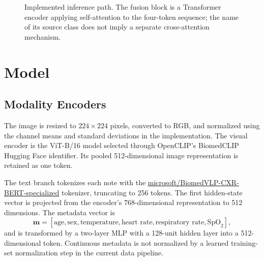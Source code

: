 \documentclass[conference]{IEEEtran}
\begin{document}
\begin{figure}[t]
{%
}
\caption{Implemented inference path. The fusion block is a Transformer encoder applying self-attention to the four-token sequence; the name of its source class does not imply a separate cross-attention mechanism.}
\label{fig:architecture}
\end{figure}

\section{Model}
\subsection{Modality Encoders}
The image is resized to $224 \times 224$ pixels, converted to RGB, and normalized using the channel means and standard deviations in the implementation. The visual encoder is the ViT-B/16 model selected through OpenCLIP's BiomedCLIP Hugging Face identifier. Its pooled 512-dimensional image representation is retained as one token.

The text branch tokenizes each note with the \url{microsoft/BiomedVLP-CXR-BERT-specialized} tokenizer, truncating to 256 tokens. The first hidden-state vector is projected from the encoder's 768-dimensional representation to 512 dimensions. The metadata vector is
\[
\mathbf{m} =
[\text{age},\text{sex},\text{temperature},\text{heart rate},
\text{respiratory rate},\text{SpO}_2],
\]
and is transformed by a two-layer MLP with a 128-unit hidden layer into a 512-dimensional token. Continuous metadata is not normalized by a learned training-set normalization step in the current data pipeline.
\end{document}
